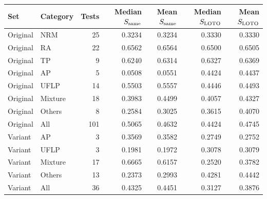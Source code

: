 \begin{tabular}{@{}llrrrrr@{}}
\toprule
Set & Category & Tests & Median $S_{\rm same}$ & Mean $S_{\rm same}$ & Median $S_{\rm LOTO}$ & Mean $S_{\rm LOTO}$\\
\midrule
Original & NRM & 25 & 0.3234 & 0.3234 & 0.3330 & 0.3330\\
Original & RA & 22 & 0.6562 & 0.6564 & 0.6500 & 0.6505\\
Original & TP & 9 & 0.6240 & 0.6314 & 0.6327 & 0.6369\\
Original & AP & 5 & 0.0508 & 0.0551 & 0.4424 & 0.4437\\
Original & UFLP & 14 & 0.5503 & 0.5557 & 0.4446 & 0.4493\\
Original & Mixture & 18 & 0.3983 & 0.4499 & 0.4057 & 0.4327\\
Original & Others & 8 & 0.2584 & 0.3025 & 0.3615 & 0.4070\\
Original & All & 101 & 0.5065 & 0.4632 & 0.4424 & 0.4745\\
\midrule
Variant & AP & 3 & 0.3569 & 0.3582 & 0.2749 & 0.2752\\
Variant & UFLP & 3 & 0.1981 & 0.1972 & 0.3078 & 0.3079\\
Variant & Mixture & 17 & 0.6665 & 0.6157 & 0.2520 & 0.3782\\
Variant & Others & 13 & 0.2373 & 0.2993 & 0.4281 & 0.4442\\
Variant & All & 36 & 0.4325 & 0.4451 & 0.3127 & 0.3876\\
\bottomrule
\end{tabular}
